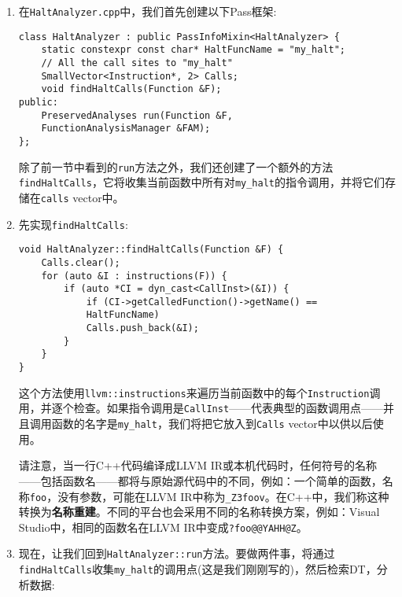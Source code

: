 \begin{enumerate}
\item 在\texttt{HaltAnalyzer.cpp}中，我们首先创建以下Pass框架:

\begin{lstlisting}[style=styleCXX]
class HaltAnalyzer : public PassInfoMixin<HaltAnalyzer> {
	static constexpr const char* HaltFuncName = "my_halt";
	// All the call sites to "my_halt"
	SmallVector<Instruction*, 2> Calls;
	void findHaltCalls(Function &F);
public:
	PreservedAnalyses run(Function &F,
	FunctionAnalysisManager &FAM);
};
\end{lstlisting}

除了前一节中看到的\texttt{run}方法之外，我们还创建了一个额外的方法\texttt{findHaltCalls}，它将收集当前函数中所有对\texttt{my\_halt}的指令调用，并将它们存储在\texttt{calls} vector中。

\item 先实现\texttt{findHaltCalls}:

\begin{lstlisting}[style=styleCXX]
void HaltAnalyzer::findHaltCalls(Function &F) {
	Calls.clear();
	for (auto &I : instructions(F)) {
		if (auto *CI = dyn_cast<CallInst>(&I)) {
			if (CI->getCalledFunction()->getName() ==
			HaltFuncName)
			Calls.push_back(&I);
		}
	}
}
\end{lstlisting}

这个方法使用\texttt{llvm::instructions}来遍历当前函数中的每个\texttt{Instruction}调用，并逐个检查。如果指令调用是\texttt{CallInst}——代表典型的函数调用点——并且调用函数的名字是\texttt{my\_halt}，我们将把它放入到\texttt{Calls} vector中以供以后使用。

\begin{tcolorbox}[colback=blue!5!white,colframe=blue!75!black, fonttitle=\bfseries,title=重建函数名]	
\hspace*{0.7cm}请注意，当一行C++代码编译成LLVM IR或本机代码时，任何符号的名称——包括函数名——都将与原始源代码中的不同，例如：一个简单的函数，名称\texttt{foo}，没有参数，可能在LLVM IR中称为\texttt{\_Z3foov}。在C++中，我们称这种转换为\textbf{名称重建}。不同的平台也会采用不同的名称转换方案，例如：Visual Studio中，相同的函数名在LLVM IR中变成\texttt{?foo@@YAHH@Z}。
\end{tcolorbox}

\item 现在，让我们回到\texttt{HaltAnalyzer::run}方法。要做两件事，将通过\texttt{findHaltCalls}收集\texttt{my\_halt}的调用点(这是我们刚刚写的)，然后检索DT，分析数据:


\end{enumerate}

